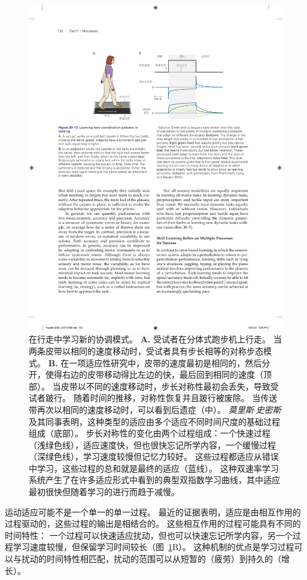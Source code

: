 \begin{figure}[htbp]
	\centering
	\includegraphics[width=0.85\linewidth]{chap30/fig_30_13}
	\caption{在行走中学习新的协调模式。
		\textbf{A.} 受试者在分体式跑步机上行走。
		当两条皮带以相同的速度移动时，受试者具有步长相等的对称步态模式。
		\textbf{B.} 在一项适应性研究中，皮带的速度最初是相同的，然后分开，使得右边的皮带移动得比左边的快，最后回到相同的速度（顶部）。
		当皮带以不同的速度移动时，步长对称性最初会丢失，导致受试者跛行。
		随着时间的推移，对称性恢复并且跛行被废除。
		当传送带再次以相同的速度移动时，可以看到后遗症（中）。
		\textit{莫里斯$\cdot$史密斯}及其同事表明，这种类型的适应由多个适应不同时间尺度的基础过程组成（底部）。
		步长对称性的变化由两个过程组成：一个快速过程（浅绿色线），适应速度快，但也很快忘记所学内容，一个缓慢过程（深绿色线），学习速度较慢但记忆力较好。
		这些过程都适应从错误中学习，这些过程的总和就是最终的适应（蓝线）。
		这种双速率学习系统产生了在许多适应形式中看到的典型双指数学习曲线，其中适应最初很快但随着学习的进行而趋于减慢\cite{roemmich2016seeing}。}
	\label{fig:30_13}
\end{figure}


运动适应可能不是一个单一的单一过程。
最近的证据表明，适应是由相互作用的过程驱动的，这些过程的输出是相结合的。
这些相互作用的过程可能具有不同的时间特性：
一个过程可以快速适应扰动，但也可以快速忘记所学内容，另一个过程学习速度较慢，但保留学习时间较长（图~\ref{fig:30_13}B）。
这种机制的优点是学习过程可以与扰动的时间特性相匹配，扰动的范围可以从短暂的（疲劳）到持久的（增长）。


